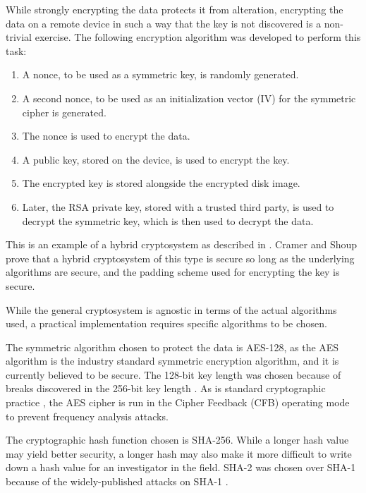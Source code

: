 
While strongly encrypting the data protects it from alteration, encrypting the data on a remote device in such
a way that the key is not discovered is a non-trivial exercise. The following encryption algorithm was developed
to perform this task:

\begin{enumerate}
  \item A nonce, to be used as a symmetric key, is randomly generated.
  \item A second nonce, to be used as an initialization vector (IV) for the symmetric cipher is generated.
  \item The nonce is used to encrypt the data.
  \item A public key, stored on the device, is used to encrypt the key.
  \item The encrypted key is stored alongside the encrypted disk image.
  \item Later, the RSA private key, stored with a trusted third party, is
        used to decrypt the symmetric key, which is then used to decrypt
        the data.
\end{enumerate}

This is an example of a hybrid cryptosystem as described in \cite{cramer2004}. Cramer and Shoup prove that a hybrid cryptosystem of
this type is secure so long as the underlying algorithms are secure, and the padding scheme used for encrypting the key is secure.


While the general cryptosystem is agnostic in terms of the actual algorithms used, a practical implementation requires specific
algorithms to be chosen.

The symmetric algorithm chosen to protect the data is AES-128, as the AES algorithm is the industry standard symmetric encryption
algorithm, and it is currently believed to be secure. The 128-bit key length was chosen because of breaks discovered in the 256-bit
key length \cite{Biryukov2009}. As is standard cryptographic practice \cite{NISTSP80038A}, the AES cipher is run in the Cipher Feedback (CFB)
operating mode to prevent frequency analysis attacks.

The cryptographic hash function chosen is SHA-256. While a longer hash value may yield better security, a longer hash may also make
it more difficult to write down a hash value for an investigator in the field. SHA-2 was chosen over SHA-1 because of the widely-published
attacks on SHA-1 \cite{Manuel2011}.

